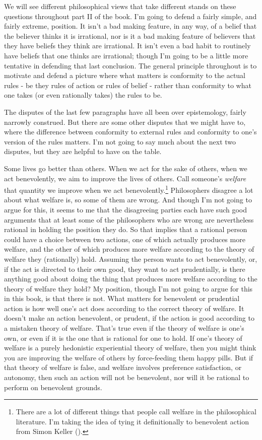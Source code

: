 \documentclass[
  10pt,
  letterpaper,
  twoside]{scrbook}
\begin{document}
We will see different philosophical views that take different stands on
these questions throughout part II of the book. I'm going to defend a
fairly simple, and fairly extreme, position. It isn't a bad making
feature, in any way, of a belief that the believer thinks it is
irrational, nor is it a bad making feature of believers that they have
beliefs they think are irrational. It isn't even a bad habit to
routinely have beliefs that one thinks are irrational; though I'm going
to be a little more tentative in defending that last conclusion. The
general principle throughout is to motivate and defend a picture where
what matters is conformity to the actual rules - be they rules of action
or rules of belief - rather than conformity to what one takes (or even
rationally takes) the rules to be.

The disputes of the last few paragraphs have all been over epistemology,
fairly narrowly construed. But there are some other disputes that we
might have to, where the difference between conformity to external rules
and conformity to one's version of the rules matters. I'm not going to
say much about the next two disputes, but they are helpful to have on
the table.

Some lives go better than others. When we act for the sake of others,
when we act benevolently, we aim to improve the lives of others. Call
someone's \emph{welfare} that quantity we improve when we act
benevolently.\footnote{There are a lot of different things that people
  call welfare in the philosophical literature. I'm taking the idea of
  tying it definitionally to benevolent action from Simon Keller
  ().} Philosophers disagree a lot about
what welfare is, so some of them are wrong. And though I'm not going to
argue for this, it seems to me that the disagreeing parties each have
such good arguments that at least some of the philosophers who are wrong
are nevertheless rational in holding the position they do. So that
implies that a rational person could have a choice between two actions,
one of which actually produces more welfare, and the other of which
produces more welfare according to the theory of welfare they
(rationally) hold. Assuming the person wants to act benevolently, or, if
the act is directed to their own good, they want to act prudentially, is
there anything good about doing the thing that produces more welfare
according to the theory of welfare they hold? My position, though I'm
not going to argue for this in this book, is that there is not. What
matters for benevolent or prudential action is how well one's act does
according to the correct theory of welfare. It doesn't make an action
benevolent, or prudent, if the action is good according to a mistaken
theory of welfare. That's true even if the theory of welfare is one's
own, or even if it is the one that is rational for one to hold. If one's
theory of welfare is a purely hedonistic experiential theory of welfare,
then you might think you are improving the welfare of others by
force-feeding them happy pills. But if that theory of welfare is false,
and welfare involves preference satisfaction, or autonomy, then such an
action will not be benevolent, nor will it be rational to perform on
benevolent grounds.
\end{document}
